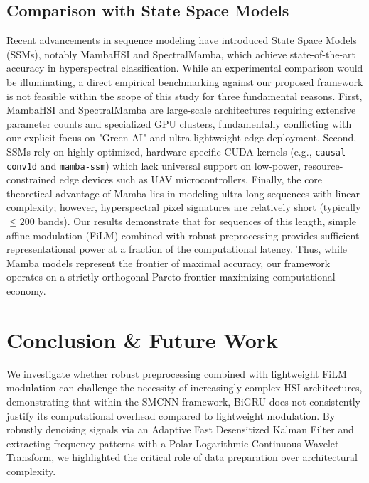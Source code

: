 \documentclass[pdflatex,sn-mathphys-num,iicol]{sn-jnl}
\begin{document}
\subsection{Comparison with State Space Models}
Recent advancements in sequence modeling have introduced State Space Models (SSMs), notably MambaHSI and SpectralMamba, which achieve state-of-the-art accuracy in hyperspectral classification. While an experimental comparison would be illuminating, a direct empirical benchmarking against our proposed framework is not feasible within the scope of this study for three fundamental reasons. First, MambaHSI and SpectralMamba are large-scale architectures requiring extensive parameter counts and specialized GPU clusters, fundamentally conflicting with our explicit focus on "Green AI" and ultra-lightweight edge deployment. Second, SSMs rely on highly optimized, hardware-specific CUDA kernels (e.g., \texttt{causal-conv1d} and \texttt{mamba-ssm}) which lack universal support on low-power, resource-constrained edge devices such as UAV microcontrollers. Finally, the core theoretical advantage of Mamba lies in modeling ultra-long sequences with linear complexity; however, hyperspectral pixel signatures are relatively short (typically $\le 200$ bands). Our results demonstrate that for sequences of this length, simple affine modulation (FiLM) combined with robust preprocessing provides sufficient representational power at a fraction of the computational latency. Thus, while Mamba models represent the frontier of maximal accuracy, our framework operates on a strictly orthogonal Pareto frontier maximizing computational economy.

\section{Conclusion \& Future Work}\label{sec:conclusion}
We investigate whether robust preprocessing combined with lightweight FiLM modulation can challenge the necessity of increasingly complex HSI architectures, demonstrating that within the SMCNN framework, BiGRU does not consistently justify its computational overhead compared to lightweight modulation. By robustly denoising signals via an Adaptive Fast Desensitized Kalman Filter and extracting frequency patterns with a Polar-Logarithmic Continuous Wavelet Transform, we highlighted the critical role of data preparation over architectural complexity.
\end{document}
